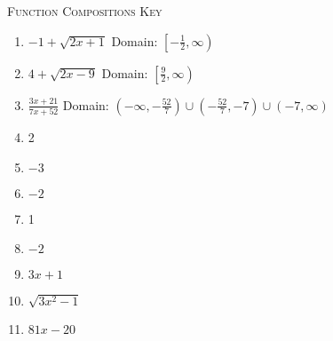 \newpage

\textsc{Function Compositions Key}

\begin{enumerate}
	\item $-1 + \sqrt{2x+1}$ Domain: $\left[-\frac{1}{2}, \infty\right)$
	\item $4 + \sqrt{2x-9}$ Domain: $\left[\frac{9}{2}, \infty\right)$
	\item $\frac{3x+21}{7x+52}$ Domain: $\left(-\infty, -\frac{52}{7}\right) \cup \left(-\frac{52}{7}, -7\right) \cup (-7, \infty)$
	\item 2
     \item $-3$
     \item $-2$
     \item 1
     \item $-2$
     \item $3x + 1$
    \item $\sqrt{3x^2-1}$
    \item $81x-20$
\end{enumerate}